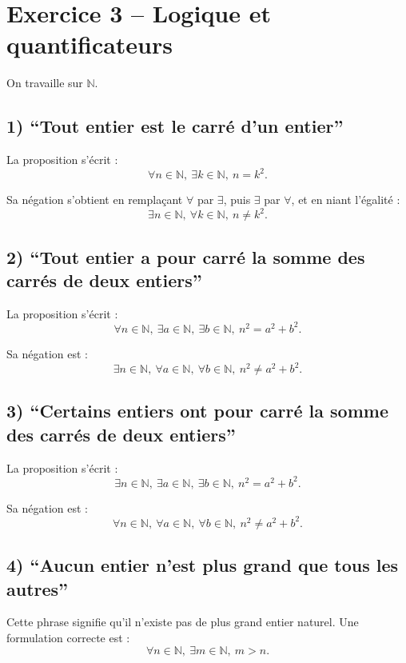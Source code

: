 \documentclass[12pt,a4paper]{article}
\begin{document}
\bigskip

\section*{Exercice 3 -- Logique et quantificateurs}

On travaille sur $\mathbb N$.

\subsection*{1) ``Tout entier est le carré d'un entier''}

La proposition s'écrit :
\[
\forall n\in\mathbb N,\ \exists k\in\mathbb N,\ n=k^2.
\]

Sa négation s'obtient en remplaçant $\forall$ par $\exists$, puis $\exists$ par $\forall$, et en niant l'égalité :
\[
\exists n\in\mathbb N,\ \forall k\in\mathbb N,\ n\neq k^2.
\]

\subsection*{2) ``Tout entier a pour carré la somme des carrés de deux entiers''}

La proposition s'écrit :
\[
\forall n\in\mathbb N,\ \exists a\in\mathbb N,\ \exists b\in\mathbb N,\ n^2=a^2+b^2.
\]

Sa négation est :
\[
\exists n\in\mathbb N,\ \forall a\in\mathbb N,\ \forall b\in\mathbb N,\ n^2\neq a^2+b^2.
\]

\subsection*{3) ``Certains entiers ont pour carré la somme des carrés de deux entiers''}

La proposition s'écrit :
\[
\exists n\in\mathbb N,\ \exists a\in\mathbb N,\ \exists b\in\mathbb N,\ n^2=a^2+b^2.
\]

Sa négation est :
\[
\forall n\in\mathbb N,\ \forall a\in\mathbb N,\ \forall b\in\mathbb N,\ n^2\neq a^2+b^2.
\]

\subsection*{4) ``Aucun entier n'est plus grand que tous les autres''}

Cette phrase signifie qu'il n'existe pas de plus grand entier naturel. Une formulation correcte est :
\[
\forall n\in\mathbb N,\ \exists m\in\mathbb N,\ m>n.
\]
\end{document}
